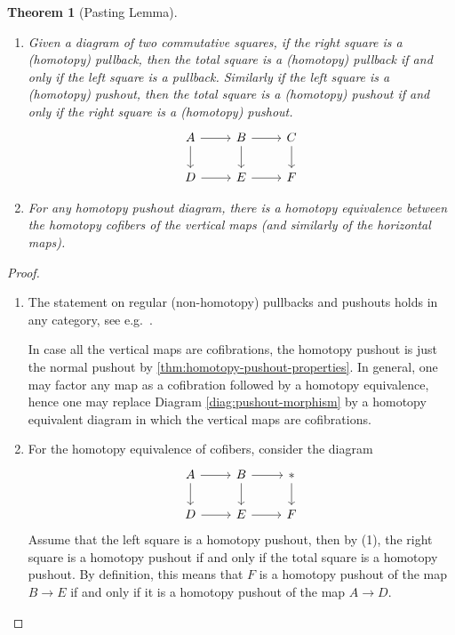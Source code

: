 \documentclass{scrartcl}
\theoremstyle{plain}
\newtheorem{theorem}{Theorem}[section]
\theoremstyle{definition}
\begin{document}
\begin{theorem}[Pasting Lemma]\label{thm:pasting-lemma}
    \begin{enumerate}
    \item Given a diagram of two commutative squares, if the right square is a (homotopy) pullback, then the total square is a (homotopy) pullback if and only if the left square is a pullback. Similarly if the left square is a (homotopy) pushout, then the total square is a (homotopy) pushout if and only if the right square is a (homotopy) pushout.
\begin{equation}\label{diag:pushout-morphism}
    \begin{tikzcd}
        A \dar\rar & B \dar\rar &\dar C \\
        D \rar & E \rar & F
    \end{tikzcd}
\end{equation}
    \item For any homotopy pushout diagram, there is a homotopy equivalence between the homotopy cofibers of the vertical maps (and similarly of the horizontal maps).
\end{enumerate}
\end{theorem}
\begin{proof}
    \begin{enumerate}
        \item The statement on regular (non-homotopy) pullbacks and pushouts holds in any category, see e.g.\ \cite[p. 72, ex. 8]{mac2013categories}.
            
            In case all the vertical maps are cofibrations, the homotopy pushout is just the normal pushout by \cref{thm:homotopy-pushout-properties}. In general, one may factor any map as a cofibration followed by a homotopy equivalence, hence one may replace Diagram \ref{diag:pushout-morphism} by a homotopy equivalent diagram in which the vertical maps are cofibrations. 
        \item For the homotopy equivalence of cofibers, consider the diagram
        \begin{equation}
            \begin{tikzcd}
                A \dar\rar & B \dar\rar &\dar * \\
                D \rar & E \rar & F
            \end{tikzcd}
        \end{equation}
        Assume that the left square is a homotopy pushout, then by (1), the right square is a homotopy pushout if and only if the total square is a homotopy pushout. By definition, this means that $F$ is a homotopy pushout of the map $B\to E$ if and only if it is a homotopy pushout of the map $A\to D$. 
    \end{enumerate}
\end{proof}
\end{document}
